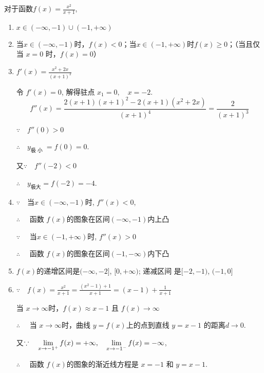 \begin{solution}
    对于函数$f(x)=\frac{x^2}{x+1}$,
\begin{enumerate}[(1)]
    \item $x\in ( - \infty , - 1) \cup ( - 1, + \infty )$ 
    \item 当$x\in(-\infty,-1)$时，$f(x)<0$；当$x\in(-1,+\infty)$时$f(x)\geqslant0$；（当且仅当 $x=0$ 时，$f(x)=0$）
    \item $f'(x)=\frac{x^2+2x}{(x+1)^2}$

令 $f'\left(x\right)=0$, 解得驻点 $x_1=0,\quad x=-2$.
$$f''(x)=\frac{2(x+1)(x+1)^2-2(x+1)(x^2+2x)}{(x+1)^4}=\frac{2}{(x+1)^{3}}$$

$\because\quad f''( 0) > 0$

$\therefore\quad y_{\text{极 小 }}= f( 0) = 0$.

又$\because\quad f'' (-2)<0$

$\therefore\quad  y_{\text{极大}}=f(-2)=-4$.

\item $\because\quad$当$x\in ( - \infty , - 1)$时, $f''( x) < 0$,

$\therefore\quad $ 函数 $f(x)$的图象在区间$(-\infty,-1)$内上凸

$\because\quad $ 当$x\in(-1,+\infty)$时, $f''(x)>0$

$\therefore\quad$ 函数 $f(x)$的图象在区间$(-1,-\infty)$内下凸

\item $f(x)$的递增区间是$(-\infty,-2]$, $[0,+\infty)$; 递减区间
是$[-2,-1)$, $(-1,0]$

\item $\because\quad f( x) = \frac {x^{2}}{x+ 1}= \frac {( x^{2}- 1) + 1}{x+ 1}=(x-1)+\frac{1}{x+1}$

当 $x\to\infty$时，$f(x)\approx x-1$ 且 $f(x)\to\infty$

$\therefore\quad $ 当  $x\to \infty$时，曲线 $y=f(x)$上的点到直线 $y=x-1$
的距离$d\to0$.

又$\because\quad \lim\limits_{x\to - 1^{+}}f( x) = + \infty,\quad \lim\limits_{x\to - 1^{- }}f( x) = - \infty$,

$\therefore\quad $ 函数 $f(x)$的图象的渐近线方程是 $x=-1$ 和
$y=x-1$.


\end{enumerate}
\end{solution}
